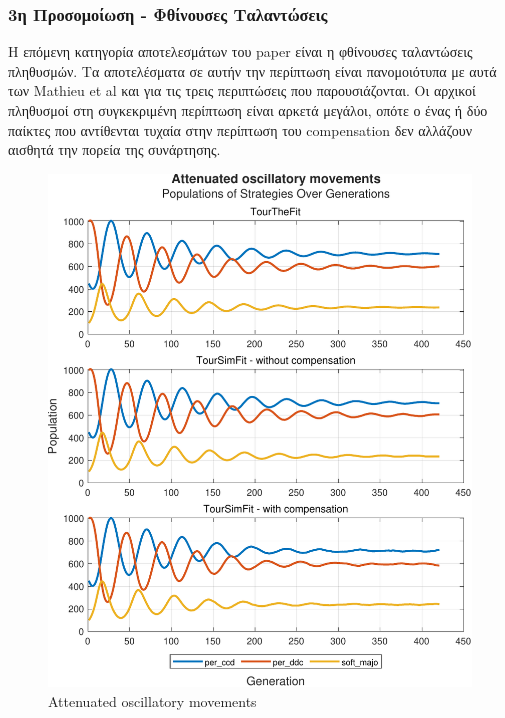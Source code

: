 \documentclass[12pt]{article}
\begin{document}
\subsubsection{3η Προσομοίωση - Φθίνουσες Ταλαντώσεις}
Η επόμενη κατηγορία αποτελεσμάτων του paper είναι η φθίνουσες ταλαντώσεις πληθυσμών. Τα αποτελέσματα σε αυτήν την περίπτωση είναι πανομοιότυπα με αυτά των Mathieu et al και για τις τρεις περιπτώσεις που παρουσιάζονται. Οι αρχικοί πληθυσμοί στη συγκεκριμένη περίπτωση είναι αρκετά μεγάλοι, οπότε ο ένας ή δύο παίκτες που αντίθενται τυχαία στην περίπτωση του compensation δεν αλλάζουν αισθητά την πορεία της συνάρτησης.
	\begin{figure}[h]
	      \centering
	      \includegraphics[scale=0.8]{Attenuated oscillatory movements.pdf}
	      \caption{Attenuated oscillatory movements}
	\end{figure}
\end{document}
